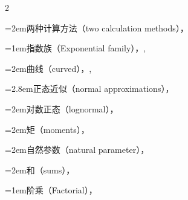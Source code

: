 \begin{multicols}{2}
\par\noindent\hangindent=2em\hspace*{1em}\label{idx:434}两种计算方法（two calculation methods），\hyperref[eq:2.2.5]{\pageref*{eq:2.2.5}}\par
\par\addvspace{2pt}
\par\noindent\hangindent=1em\hspace*{0em}\label{idx:435}指数族（Exponential family），\hyperref[eq:3.4.1]{\pageref*{eq:3.4.1}}, \hyperref[exercise:3.28]{\pageref*{exercise:3.28}}\par
\par\noindent\hangindent=2em\hspace*{1em}\label{idx:436}曲线（curved），\hyperref[def:3.4.7]{\pageref*{def:3.4.7}}, \hyperref[idxocc:436:265]{\pageref*{idxocc:436:265}}\par
\par\noindent\hangindent=2.8em\hspace*{1.8em}\label{idx:437}正态近似（normal approximations），\hyperref[exercise:3.34]{\pageref*{exercise:3.34}}\par
\par\noindent\hangindent=2em\hspace*{1em}\label{idx:438}对数正态（lognormal），\hyperref[sec:3.8.3]{\pageref*{sec:3.8.3}}\par
\par\noindent\hangindent=2em\hspace*{1em}\label{idx:439}矩（moments），\hyperref[thm:3.4.2]{\pageref*{thm:3.4.2}}\par
\par\noindent\hangindent=2em\hspace*{1em}\label{idx:440}自然参数（natural parameter），\hyperref[idxocc:440:125]{\pageref*{idxocc:440:125}}\par
\par\noindent\hangindent=2em\hspace*{1em}\label{idx:441}和（sums），\hyperref[thm:5.2.11]{\pageref*{thm:5.2.11}}\par
\par\addvspace{2pt}
\par\noindent\hangindent=1em\hspace*{0em}\label{idx:442}阶乘（Factorial），\hyperref[def:1.2.16]{\pageref*{def:1.2.16}}\par

\end{multicols}
